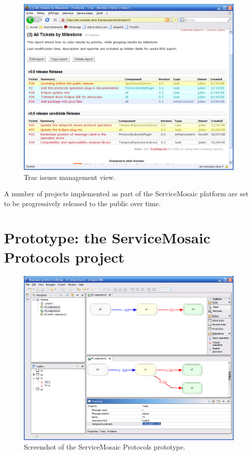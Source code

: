 \begin{figure}[tbhp]
    \centering
    \includegraphics[width=\textwidth]{content/protocols-project/trac-issues}
    \caption{Trac issues management view.}
    \label{fig:trac-issues}
\end{figure}

A number of projects implemented as part of the ServiceMosaic platform are set to be progressively released to the public over time.


\section{Prototype: the ServiceMosaic Protocols project}


\begin{figure}[tbhp]
    \centering
    \includegraphics[width=\textwidth]{content/protocols-project/proto-screenshot}
    \caption{Screenshot of the ServiceMosaic Protocols prototype.}
    \label{fig:proto-screenshot}
\end{figure}

